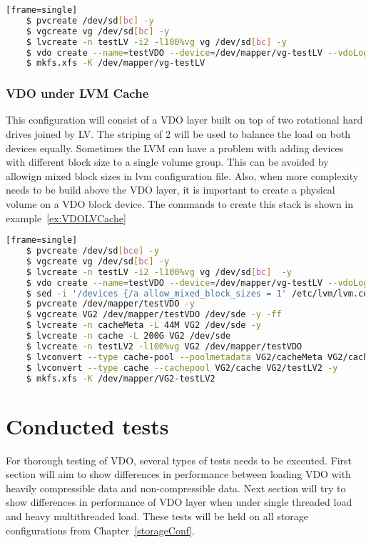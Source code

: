 \documentclass[
  color, %
  table, %
  lof,   %
  lot,   %
]{fithesis3}
\begin{document}
\begin{lstlisting}[language=bash, label={ex:VDOLV}, caption={Creating VDO over striped LV}][frame=single]
    $ pvcreate /dev/sd[bc] -y
    $ vgcreate vg /dev/sd[bc] -y
    $ lvcreate -n testLV -i2 -l100%vg vg /dev/sd[bc] -y
    $ vdo create --name=testVDO --device=/dev/mapper/vg-testLV --vdoLogicalSize=60T  --vdoSlabSize=8g --force
    $ mkfs.xfs -K /dev/mapper/vg-testLV      
\end{lstlisting}

\subsection{VDO under LVM Cache}
This configuration will consist of a VDO layer built on top of two rotational hard drives joined by LV. The striping of 2 will be used to balance the load on both devices equally. Sometimes the LVM can have a problem with adding devices with different block size to a single volume group. This can be avoided by allowign mixed block sizes in lvm configuration file. Also, when more complexity needs to be build above the VDO layer, it is important to create a physical volume on a VDO block device. The commands to create this stack is shown in example~\ref{ex:VDOLVCache}

\begin{lstlisting}[language=bash, label={ex:VDOLVCache}, caption={Creating cached VDO volume}][frame=single]
    $ pvcreate /dev/sd[bce] -y
    $ vgcreate vg /dev/sd[bc] -y
    $ lvcreate -n testLV -i2 -l100%vg vg /dev/sd[bc]  -y    
    $ vdo create --name=testVDO --device=/dev/mapper/vg-testLV --vdoLogicalSize=60T --vdoSlabSize=8g --force    
    $ sed -i '/devices {/a allow_mixed_block_sizes = 1' /etc/lvm/lvm.conf
    $ pvcreate /dev/mapper/testVDO -y
    $ vgcreate VG2 /dev/mapper/testVDO /dev/sde -y -ff
    $ lvcreate -n cacheMeta -L 44M VG2 /dev/sde -y
    $ lvcreate -n cache -L 200G VG2 /dev/sde
    $ lvcreate -n testLV2 -l100%vg VG2 /dev/mapper/testVDO
    $ lvconvert --type cache-pool --poolmetadata VG2/cacheMeta VG2/cache -y
    $ lvconvert --type cache --cachepool VG2/cache VG2/testLV2 -y
    $ mkfs.xfs -K /dev/mapper/VG2-testLV2
\end{lstlisting}


\chapter{Conducted tests}
For thorough testing of VDO, several types of tests needs to be executed. First section will aim to show differences in performance between loading VDO with heavily compressible data and non-compressible data. Next section will try to show differences in performance of VDO layer when under single threaded load and heavy multithreaded load. These tests will be held on all storage configurations from Chapter~\ref{storageConf}.
\end{document}
